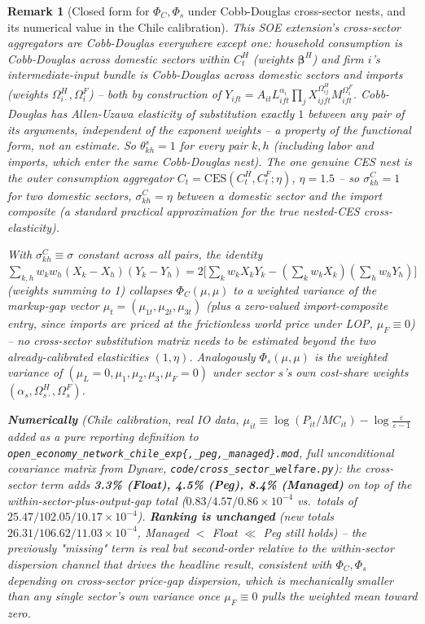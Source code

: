 \documentclass[12pt]{article}
\newtheorem{remark}{Remark}
\begin{document}
\begin{remark}[Closed form for $\Phi_C,\Phi_s$ under Cobb-Douglas cross-sector nests, and its numerical value in the Chile calibration]
\label{rem:phic-closed-form}
This SOE extension's cross-sector aggregators are Cobb-Douglas everywhere except one: household consumption is Cobb-Douglas \emph{across domestic sectors} within $C_t^H$ (weights $\bm\beta^H$) and firm $i$'s intermediate-input bundle is Cobb-Douglas across domestic sectors \emph{and} imports (weights $\Omega^H_{i\cdot},\Omega^F_i$) -- both by construction of $Y_{ift}=A_{it}L_{ift}^{\alpha_i}\prod_jX_{ijft}^{\Omega^H_{ij}}M_{ift}^{\Omega^F_i}$. Cobb-Douglas has Allen-Uzawa elasticity of substitution \emph{exactly} $1$ between any pair of its arguments, independent of the exponent weights -- a property of the functional form, not an estimate. So $\theta^s_{kh}=1$ for every pair $k,h$ (including labor and imports, which enter the same Cobb-Douglas nest). The one genuine CES nest is the \emph{outer} consumption aggregator $C_t=\mathrm{CES}(C_t^H,C_t^F;\eta)$, $\eta=1.5$ -- so $\sigma^C_{kh}=1$ for two domestic sectors, $\sigma^C_{kh}=\eta$ between a domestic sector and the import composite (a standard practical approximation for the true nested-CES cross-elasticity).

With $\sigma^C_{kh}\equiv\sigma$ constant across all pairs, the identity $\sum_{k,h}w_kw_h(X_k-X_h)(Y_k-Y_h)=2\big[\sum_kw_kX_kY_k-(\textstyle\sum_kw_kX_k)(\sum_hw_hY_h)\big]$ (weights summing to 1) collapses $\Phi_C(\mu,\mu)$ to a \emph{weighted variance} of the markup-gap vector $\mu_t=(\mu_{1t},\mu_{2t},\mu_{3t})$ (plus a zero-valued import-composite entry, since imports are priced at the frictionless world price under LOP, $\mu_F\equiv0$) -- no cross-sector substitution matrix needs to be estimated beyond the two already-calibrated elasticities $(1,\eta)$. Analogously $\Phi_s(\mu,\mu)$ is the weighted variance of $(\mu_L{=}0,\mu_1,\mu_2,\mu_3,\mu_F{=}0)$ under sector $s$'s own cost-share weights $(\alpha_s,\Omega^H_{s\cdot},\Omega^F_s)$.

\textbf{Numerically} (Chile calibration, real IO data, $\mu_{it}\equiv\log(P_{it}/MC_{it})-\log\frac{\varepsilon}{\varepsilon-1}$ added as a pure reporting definition to \texttt{open\_economy\_network\_chile\_exp\{,\_peg,\_managed\}.mod}, full unconditional covariance matrix from Dynare, \texttt{code/cross\_sector\_welfare.py}): the cross-sector term adds \textbf{3.3\% (Float), 4.5\% (Peg), 8.4\% (Managed)} on top of the within-sector-plus-output-gap total ($0.83/4.57/0.86\times10^{-4}$ vs.\ totals of $25.47/102.05/10.17\times10^{-4}$). \textbf{Ranking is unchanged} (new totals $26.31/106.62/11.03\times10^{-4}$, Managed $<$ Float $\ll$ Peg still holds) -- the previously "missing" term is real but second-order relative to the within-sector dispersion channel that drives the headline result, consistent with $\Phi_C,\Phi_s$ depending on \emph{cross}-sector price-gap dispersion, which is mechanically smaller than any single sector's own variance once $\mu_F\equiv0$ pulls the weighted mean toward zero.
\end{remark}
\end{document}
